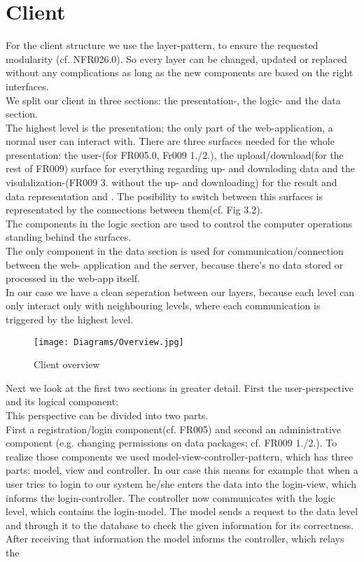 \documentclass{book}
\begin{document}
\section{Client} 
For the client structure we use the layer-pattern, to  ensure the requested modularity (cf. NFR026.0).
So every layer can be changed, updated or replaced without any complications as long as
 the new components are based on the right interfaces.\\
We split our client in three sections: the presentation-, the logic- and the data section.\\
The highest level is the presentation; the only part of the web-application, a normal user
can interact with. There are three surfaces needed for the whole presentation: 
the user-(for FR005.0, Fr009 1./2.), the upload/download(for the rest of FR009) surface for everything
regarding up- and downloding data and the visulalization-(FR009 3. without the up- and downloading)
for the result and data representation and . The posibility to switch between this surfaces is 
representated by the connections between them(cf. Fig 3.2).\\
The components in the logic section are used to control the computer operations standing behind the
surfaces.\\
The only component in the data section is used for communication/connection between the web- application
and the server, because there's no data stored or processed in the web-app itself.\\
In our case we have a clean seperation between our layers, because each level can only interact only
with neighbouring levels, where each communication is triggered by the highest level.
\begin{figure}[H]
\centering
\texttt{[image: Diagrams/Overview.jpg]}
\caption{Client overview}
\label{Fig. 3}
\end{figure}
Next we look at the first two sections in greater detail. First the user-perspective and its logical component:\\ This perspective can be divided into two parts.\\ First a registration/login component(cf. FR005) and second an administrative component (e.g. changing permissions on data packages; cf. FR009 1./2.). To realize those components we used model-view-controller-pattern, which has three parts: model, view and controller. In our case this means for example that when a user tries to login to our system he/she enters the data into the login-view, which informs the login-controller. The controller now communicates with the logic level, which contains the login-model. The model sends a request to the data level and through it to the database to check the given information for its correctness. After receiving that information the model informs the controller, which relays the  
\end{document}
